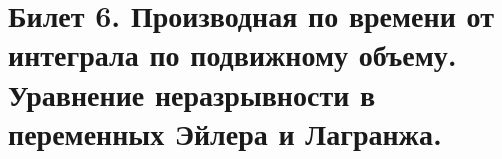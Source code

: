 \newpage
\section{Билет 6. Производная по времени от интеграла по подвижному объему. Уравнение неразрывности в переменных Эйлера и Лагранжа.}